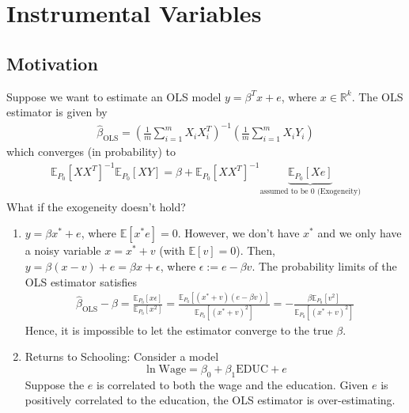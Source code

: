 \documentclass[11pt]{elegantbook}
\begin{document}
\section{Instrumental Variables}
\subsection{Motivation}
Suppose we want to estimate an OLS model $y=\beta^Tx+e$, where $x\in \mathbb{R}^k$. The OLS estimator is given by
\begin{equation}
    \begin{aligned}
        \hat{\beta}_\text{OLS}=\left(\frac{1}{m}\sum_{i=1}^mX_iX_i^T\right)^{-1}\left(\frac{1}{m}\sum_{i=1}^mX_iY_i\right)
    \end{aligned}
    \nonumber
\end{equation}
which converges (in probability) to
\begin{equation}
    \begin{aligned}
        \mathbb{E}_{P_0}[XX^T]^{-1}\mathbb{E}_{P_0}[XY]=\beta+\mathbb{E}_{P_0}[XX^T]^{-1}\underbrace{\mathbb{E}_{P_0}[Xe]}_\text{assumed to be $0$ (Exogeneity)}
    \end{aligned}
    \nonumber
\end{equation}
What if the exogeneity doesn't hold?

\begin{example}
    \begin{enumerate}
        \item $y=\beta x^*+e$, where $\mathbb{E}[x^*e]=0$. However, we don't have $x^*$ and we only have a noisy variable $x=x^*+v$ (with $\mathbb{E}[v]=0$). Then, $y=\beta(x-v)+e=\beta x+\epsilon$, where $\epsilon:=e-\beta v$. The probability limits of the OLS estimator satisfies
        \begin{equation}
            \begin{aligned}
                \hat{\beta}_\text{OLS}-\beta=\frac{\mathbb{E}_{P_0}[x\epsilon]}{\mathbb{E}_{P_0}[x^2]}=\frac{\mathbb{E}_{P_0}[(x^*+v)(e-\beta v)]}{\mathbb{E}_{P_0}[(x^*+v)^2]}=-\frac{\beta\mathbb{E}_{P_0}[v^2]}{\mathbb{E}_{P_0}[(x^*+v)^2]}
            \end{aligned}
            \nonumber
        \end{equation}
        Hence, it is impossible to let the estimator converge to the true $\beta$.
        \item Returns to Schooling: Consider a model $$\ln\text{Wage}=\beta_0+\beta_1\text{EDUC}+e$$
        Suppose the $e$ is correlated to both the wage and the education. Given $e$ is positively correlated to the education, the OLS estimator is over-estimating.
    \end{enumerate}
\end{example}
\end{document}
